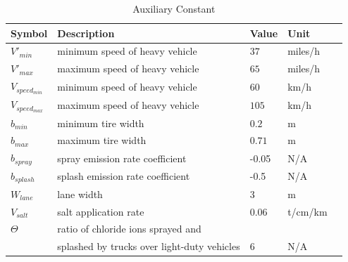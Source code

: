 \documentclass[12pt]{article}
\begin{document}
\begin{table}[!h]

  \renewcommand{\arraystretch}{1.2}
\noindent \begin{longtable*}{l l l l c} 
  \toprule
 \textbf{Symbol} & \textbf{Description} & \textbf{Value} & \textbf{Unit}\\


  \midrule 
  $V'_{min}$ & minimum speed of heavy vehicle & $37$ & miles/h  
  \\
  $V'_{max}$ & maximum speed of heavy vehicle & $65$ & miles/h   
  \\
  $V_{speed_{min}}$ & minimum speed of heavy vehicle & $60$ & km/h   
  \\
  $V_{speed_{max}}$ & maximum speed of heavy vehicle & $105$ & km/h
  \\
  $b_{min}$ & minimum tire width & $0.2$ & m 
  \\
  $b_{max}$ & maximum tire width & $0.71$ & m 
  \\ 
  $b_{spray}$ & spray emission rate coefficient & -0.05 & N/A
  \\
  $b_{splash}$ & splash emission rate coefficient & -0.5 & N/A
  \\
  $W_{lane}$ & lane width & 3 & m
  \\  
  $V_{salt}$ & salt application rate & 0.06 & t/cm/km
  \\
  $\Theta$ & ratio of chloride ions sprayed and  \\
  & splashed by trucks over light-duty vehicles& 6 & N/A
  \\  
  
  \bottomrule
\end{longtable*}
  \caption{Auxiliary Constant} \label{TblConstants}
\end{table}


\newpage
\end{document}
